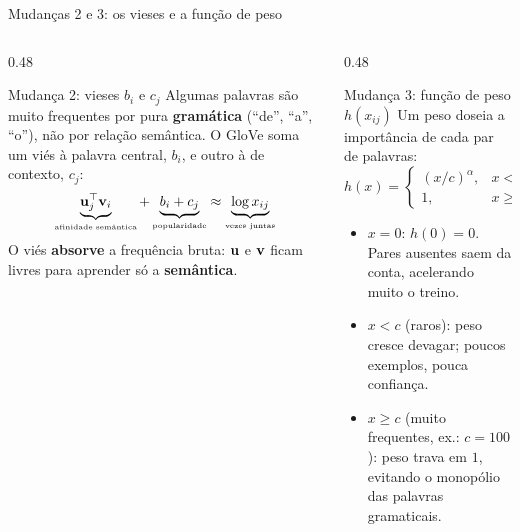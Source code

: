 \begin{frame}{Mudanças 2 e 3: os vieses e a função de peso}
    \footnotesize
    \begin{columns}[t]
        \begin{column}{0.48\textwidth}
            \begin{block}{Mudança 2: vieses $b_i$ e $c_j$}
                \scriptsize
                Algumas palavras são muito frequentes por pura \textbf{gramática} (``de'', ``a'', ``o''), não por relação semântica. O GloVe soma um viés à palavra central, $b_i$, e outro à de contexto, $c_j$:
                \begin{equation*}
                    \underbrace{\mathbf{u}_j^\top \mathbf{v}_i}_{\text{\tiny afinidade semântica}}
                    + \underbrace{b_i + c_j}_{\text{\tiny popularidade}}
                    \approx \underbrace{\log x_{ij}}_{\text{\tiny vezes juntas}}
                \end{equation*}
                O viés \textbf{absorve} a frequência bruta: $\mathbf{u}$ e $\mathbf{v}$ ficam livres para aprender só a \textbf{semântica}.
            \end{block}
        \end{column}
        \begin{column}{0.48\textwidth}
            \begin{block}{Mudança 3: função de peso $h(x_{ij})$}
                \scriptsize
                Um peso doseia a importância de cada par de palavras:
                \begin{equation*}
                    h(x) = \begin{cases}
                        (x / c)^{\alpha}, & x < c \\
                        1, & x \ge c
                    \end{cases}
                \end{equation*}
                \begin{itemize}\setlength{\itemsep}{1pt}
                    \item $x = 0$: $h(0) = 0$. Pares ausentes saem da conta, acelerando muito o treino.
                    \item $x < c$ (raros): peso cresce devagar; poucos exemplos, pouca confiança.
                    \item $x \ge c$ (muito frequentes, ex.: $c = 100$): peso trava em $1$, evitando o monopólio das palavras gramaticais.
                \end{itemize}
            \end{block}
        \end{column}
    \end{columns}


\end{frame}
